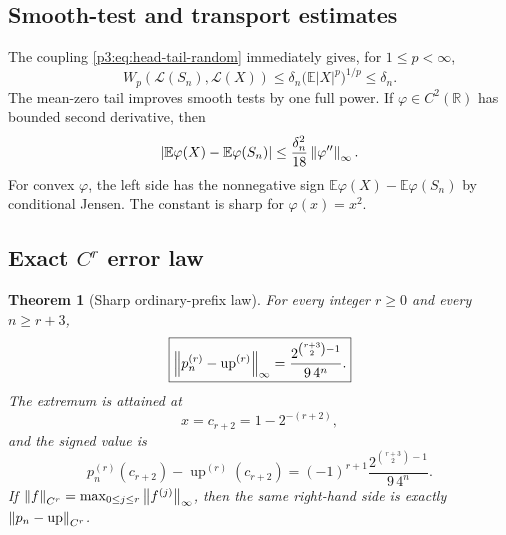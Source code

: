 \documentclass[11pt,oneside]{article}
\numberwithin{equation}{section}
\newtheorem{theorem}{Theorem}[section]
\theoremstyle{definition}
\theoremstyle{remark}
\newcommand{\R}{\mathbb R}
\newcommand{\E}{\mathbb E}
\newcommand{\Up}{\operatorname{up}}
\begin{document}
\subsection{Smooth-test and transport estimates}

The coupling \cref{p3:eq:head-tail-random} immediately gives, for $1\le p<\infty$,
\begin{equation}
 W_p(\mathcal L(S_n),\mathcal L(X))
 \le \delta_n\bigl(\E|X|^p\bigr)^{1/p}\le\delta_n.
 \label{p3:eq:wasserstein-bound}
\end{equation}
The mean-zero tail improves smooth tests by one full power.  If
$\varphi\in C^2(\R)$ has bounded second derivative, then
\begin{equation}
 \left|\E\varphi(X)-\E\varphi(S_n)\right|
 \le\frac{\delta_n^2}{18}\norm{\varphi''}_\infty.
 \label{p3:eq:smooth-test-bound}
\end{equation}
For convex $\varphi$, the left side has the nonnegative sign
$\E\varphi(X)-\E\varphi(S_n)$ by conditional Jensen.  The constant is sharp for
$\varphi(x)=x^2$.

\subsection{Exact $C^r$ error law}

\begin{theorem}[Sharp ordinary-prefix law]
\label{p3:thm:sharp-prefix-law}
For every integer $r\ge0$ and every $n\ge r+3$,
\begin{equation}
 \boxed{
 \norm{p_n^{(r)}-\Up^{(r)}}_\infty
 =\frac{2^{\binom{r+3}{2}-1}}{9\,4^n}.}
 \label{p3:eq:sharp-prefix-law}
\end{equation}
The extremum is attained at
\begin{equation}
 x=c_{r+2}=1-2^{-(r+2)},
 \label{p3:eq:error-extremizer}
\end{equation}
and the signed value is
\begin{equation}
 p_n^{(r)}(c_{r+2})-\Up^{(r)}(c_{r+2})
 =(-1)^{r+1}\frac{2^{\binom{r+3}{2}-1}}{9\,4^n}.
 \label{p3:eq:signed-error-extremizer}
\end{equation}
If
$\left\lVert f\right\rVert_{C^r}=\max_{0\le j\le r}\left\lVert f^{(j)}\right\rVert_\infty$, then the same right-hand
side is exactly $\norm{p_n-\Up}_{C^r}$.
\end{theorem}
\end{document}
